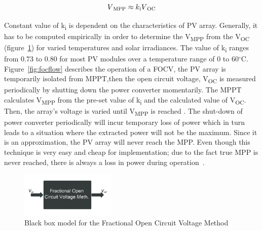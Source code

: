 {  \begin{equation}
    \begin{aligned}
  V\textsubscript{MPP}\approx k\textsubscript{i}V\textsubscript{OC}
  \label{eq:equ_fracoc}
  \end{aligned}
  \end{equation}
  
  Constant value of k\textsubscript{i} is dependent on the characteristics of \ac{PV} array. Generally, it has to be computed empirically in order to determine the V\textsubscript{MPP} from the V\textsubscript{OC} (figure~\ref{fig:Frac_block}) for varied temperatures and solar irradiances. The value of k\textsubscript{i} ranges from 0.73 to 0.80  for most \ac{PV} modules over a temperature range of 0 to 60$^\circ$C. Figure~\ref{fig:focflow} describes the operation of a \ac{FOCV}, the \ac{PV} array is temporarily isolated from \ac{MPPT},then the open circuit voltage, V\textsubscript{OC} is measured periodically by shutting down the power converter momentarily. The \ac{MPPT} calculates V\textsubscript{MPP} from the pre-set value of k\textsubscript{i} and the calculated value of V\textsubscript{OC}. Then, the array's voltage is varied until V\textsubscript{MPP} is  reached . The shut-down of power converter periodically will incur temporary loss of power which in turn leads to a situation where the extracted power will not be the maximum. Since it is an approximation, the \ac{PV} array will never reach the \ac{MPP}. Even though this technique is very easy and cheap for implementation; due to the fact true \ac{MPP} is never reached, there is always a loss in power during operation~\cite{ngan2011study}.
  
  \begin{figure}[H]
             \begin{center}
             \includegraphics[width=0.4\textwidth]{images/Frac_oc_n}
             \caption{ Black box model for the Fractional Open Circuit Voltage Method }
             \label{fig:Frac_block}
        \end{center}
      \end{figure}
  
}
